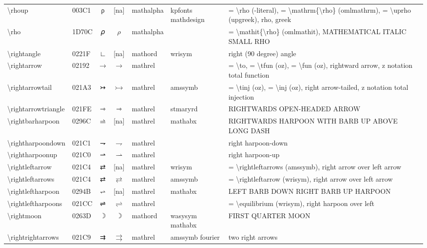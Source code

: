 \documentclass[a4paper,landscape]{article}
\begin{document}
\begin{longtable}{llcclll}
\textbackslash{}rhoup & 003C1 & ρ & [na] & mathalpha & kpfonts mathdesign & = \textbackslash{}rho (-literal), = \textbackslash{}mathrm\{\textbackslash{}rho\} (omlmathrm),  = \textbackslash{}uprho (upgreek),  rho,  greek \\
\textbackslash{}rho & 1D70C & 𝜌 & $\rho$ & mathalpha &  & = \textbackslash{}mathit\{\textbackslash{}rho\} (omlmathit), MATHEMATICAL ITALIC SMALL RHO \\
\textbackslash{}rightangle & 0221F & ∟ & [na] & mathord & wrisym & right (90 degree) angle \\
\textbackslash{}rightarrow & 02192 & → & $\rightarrow$ & mathrel &  & = \textbackslash{}to, = \textbackslash{}tfun (oz), = \textbackslash{}fun (oz), rightward arrow, z notation total function \\
\textbackslash{}rightarrowtail & 021A3 & ↣ & $\rightarrowtail$ & mathrel & amssymb & = \textbackslash{}tinj (oz), = \textbackslash{}inj (oz), right arrow-tailed, z notation total injection \\
\textbackslash{}rightarrowtriangle & 021FE & ⇾ & $\rightarrowtriangle$ & mathrel & stmaryrd & RIGHTWARDS OPEN-HEADED ARROW \\
\textbackslash{}rightbarharpoon & 0296C & ⥬ & [na] & mathrel & mathabx & RIGHTWARDS HARPOON WITH BARB UP ABOVE LONG DASH \\
\textbackslash{}rightharpoondown & 021C1 & ⇁ & $\rightharpoondown$ & mathrel &  & right harpoon-down \\
\textbackslash{}rightharpoonup & 021C0 & ⇀ & $\rightharpoonup$ & mathrel &  & right harpoon-up \\
\textbackslash{}rightleftarrow & 021C4 & ⇄ & [na] & mathrel & wrisym & = \textbackslash{}rightleftarrows (amssymb),  right arrow over left arrow \\
\textbackslash{}rightleftarrows & 021C4 & ⇄ & $\rightleftarrows$ & mathrel & amssymb & = \textbackslash{}rightleftarrow (wrisym), right arrow over left arrow \\
\textbackslash{}rightleftharpoon & 0294B & ⥋ & [na] & mathrel & mathabx & LEFT BARB DOWN RIGHT BARB UP HARPOON \\
\textbackslash{}rightleftharpoons & 021CC & ⇌ & $\rightleftharpoons$ & mathrel &  & = \textbackslash{}equilibrium (wrisym), right harpoon over left \\
\textbackslash{}rightmoon & 0263D & \textsf ☽ & $\rightmoon$ & mathord & wasysym mathabx & FIRST QUARTER MOON \\
\textbackslash{}rightrightarrows & 021C9 & ⇉ & $\rightrightarrows$ & mathrel & amssymb fourier & two right arrows \\

\end{longtable}
\end{document}
